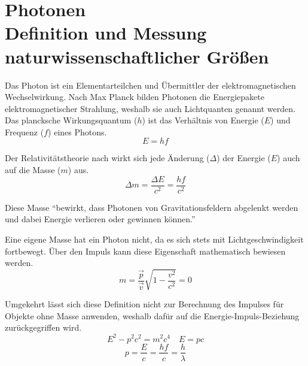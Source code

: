 \section[Photonen\hfill Definition und Messung naturwissenschaftlicher Größen]{Photonen\\{\normalsize Definition und Messung naturwissenschaftlicher Größen}}
Das Photon ist ein Elementarteilchen und Übermittler der elektromagnetischen Wechselwirkung. Nach Max Planck bilden Photonen die Energiepakete elektromagnetischer Strahlung, weshalb sie auch Lichtquanten genannt werden. Das plancksche Wirkungsquantum ($h$) ist das Verhältnis von Energie ($E$) und Frequenz ($f$) eines Photons.
$$E=hf$$
\begin{vardef}
\end{vardef}

Der Relativitätstheorie nach wirkt sich jede Änderung ($\Delta$) der Energie ($E$) auch auf die Masse ($m$) aus.
$${\Delta}m = \frac{{\Delta}E}{c^2} = \frac{hf}{c^2}$$
\begin{vardef}
\end{vardef}

Diese Masse \enquote{bewirkt, dass Photonen von Gravitationsfeldern abgelenkt werden und dabei Energie verlieren oder gewinnen können.} \cite{ulm:photon}

Eine eigene Masse hat ein Photon nicht, da es sich stets mit Lichtgeschwindigkeit fortbewegt. Über den Impuls kann diese Eigenschaft mathematisch bewiesen werden.
$$m = \frac{\vec{p}}{\vec{v}}\sqrt{1-\frac{v^2}{c^2}} = 0$$
\begin{vardef}
\end{vardef}

Umgekehrt lässt sich diese Definition nicht zur Berechnung des Impulses für Objekte ohne Masse anwenden, weshalb dafür auf die Energie-Impuls-Beziehung zurückgegriffen wird.
$$E^2-p^2c^2 = m^2c^4 \quad E=pc$$
$$p=\frac{E}{c}=\frac{hf}{c}=\frac{h}{\lambda}$$
\begin{vardef}
\end{vardef}



